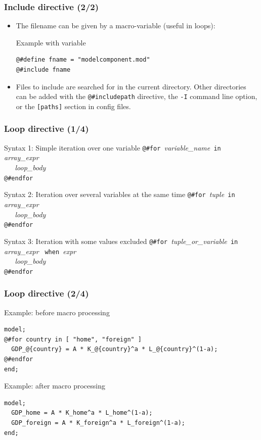 \documentclass[aspectratio=169]{beamer}
\begin{document}
\begin{frame}[fragile=singleslide]
  \frametitle{Include directive (2/2)}
  \begin{itemize}
\item The filename can be given by a macro-variable (useful in loops):
    \begin{block}{Example with variable}
\begin{verbatim}
@#define fname = "modelcomponent.mod"
@#include fname
\end{verbatim}
    \end{block}
  \item Files to include are searched for in the current directory. Other directories can
    be added with the
    \verb+@#includepath+ directive, the \texttt{-I} command line option, or the
    \texttt{[paths]} section in config files.
  \end{itemize}
\end{frame}

\begin{frame}[fragile=singleslide]
  \frametitle{Loop directive (1/4)}
  \begin{block}{Syntax 1: Simple iteration over one variable}
\verb+@#for +\textit{variable\_name}\verb+ in +\textit{array\_expr} \\
\verb+   +\textit{loop\_body} \\
\verb+@#endfor+
  \end{block}
  \begin{block}{Syntax 2: Iteration over several variables at the same time}
\verb+@#for +\textit{tuple}\verb+ in +\textit{array\_expr} \\
\verb+   +\textit{loop\_body} \\
\verb+@#endfor+
  \end{block}
  \begin{block}{Syntax 3: Iteration with some values excluded}
\verb+@#for +\textit{tuple\_or\_variable}\verb+ in +\textit{array\_expr} \verb+ when +\textit{expr}\\
\verb+   +\textit{loop\_body} \\
\verb+@#endfor+
  \end{block}
\end{frame}

\begin{frame}[fragile=singleslide]
  \frametitle{Loop directive (2/4)}
  \begin{block}{Example: before macro processing}
    \small
\begin{verbatim}
model;
@#for country in [ "home", "foreign" ]
  GDP_@{country} = A * K_@{country}^a * L_@{country}^(1-a);
@#endfor
end;
\end{verbatim}
    \normalsize
  \end{block}

  \begin{block}{Example: after macro processing}
    \small
\begin{verbatim}
model;
  GDP_home = A * K_home^a * L_home^(1-a);
  GDP_foreign = A * K_foreign^a * L_foreign^(1-a);
end;
\end{verbatim}
    \normalsize
  \end{block}
\end{frame}
\end{document}
